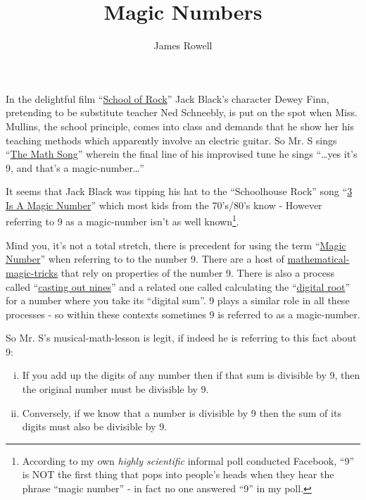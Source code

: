 \documentclass{article}
\title{Magic Numbers}
\author{James Rowell}
\begin{document}
\maketitle

In the delightful film ``\href{https://en.wikipedia.org/wiki/School_of_Rock}{School
of Rock}'' Jack Black's character Dewey Finn,
pretending to be substitute teacher Ned Schneebly, is put on the spot when
Miss. Mullins, the school principle, comes into class and demands that he show
her his teaching methods which apparently involve an electric guitar.
So Mr. S sings ``\href{https://www.youtube.com/watch?v=aa8U0nL-KXg}{The
Math Song}'' wherein the final line of his
improvised tune he sings ``\dots{}yes it's 9, and that's a magic-number\dots{}''

It seems that Jack Black was tipping his hat
to the ``Schoolhouse Rock'' song ``\href{https://youtu.be/aU4pyiB-kq0}{3
Is A Magic Number}''
which most kids from the 70's/80's know -
However referring to 9 as a magic-number isn't
as well known\footnote{According to my own \emph{highly scientific}
informal poll conducted Facebook, %
``9'' is NOT the first thing that pops into people's heads when they
hear the phrase ``magic number'' - in fact no one answered ``9'' in my poll.}.

Mind you, it's not a total stretch, there is precedent
for using the term ``\href{http://mathworld.wolfram.com/MagicNumber.html}{Magic
Number}'' when referring to to the number 9.
There are a host of
\href{http://mathematics-in-europe.eu/?p=144}{mathematical-magic-tricks}
that rely on properties of the number 9.
There is also a process called
``\href{https://en.wikipedia.org/wiki/Casting_out_nines}{casting out nines}'' and a related one 
called calculating the
``\href{http://mathworld.wolfram.com/DigitalRoot.html}{digital root}''
for a number where you take its ``digital sum''. 9
plays a similar role in all these processes - so within these contexts sometimes 9
is referred to as a magic-number.

So Mr. S's musical-math-lesson is legit, if indeed he is referring to this fact about 9:
\begin{enumerate}[i)]
\item
If you add up the digits of
any number then if that sum is divisible by 9, then the original number
must be divisible by 9.
\item
Conversely, if we know
that a number is divisible by 9 then the sum of its digits must also be
divisible by 9.
\end{enumerate}
\end{document}
